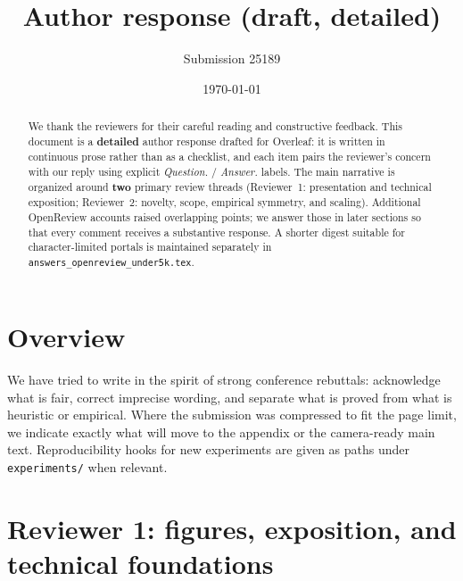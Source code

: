 \documentclass[11pt,a4paper]{article}
\title{Author response (draft, detailed)}
\author{Submission 25189}
\date{\today}
\begin{document}
\maketitle

\begin{abstract}
\noindent
We thank the reviewers for their careful reading and constructive feedback. This document is a \textbf{detailed} author response drafted for Overleaf: it is written in continuous prose rather than as a checklist, and each item pairs the reviewer's concern with our reply using explicit \textit{Question.} / \textit{Answer.} labels. The main narrative is organized around \textbf{two} primary review threads (Reviewer~1: presentation and technical exposition; Reviewer~2: novelty, scope, empirical symmetry, and scaling). Additional OpenReview accounts raised overlapping points; we answer those in later sections so that every comment receives a substantive response. A shorter digest suitable for character-limited portals is maintained separately in \texttt{answers\_openreview\_under5k.tex}.
\end{abstract}

\section*{Overview}

\noindent
We have tried to write in the spirit of strong conference rebuttals: acknowledge what is fair, correct imprecise wording, and separate what is proved from what is heuristic or empirical. Where the submission was compressed to fit the page limit, we indicate exactly what will move to the appendix or the camera-ready main text. Reproducibility hooks for new experiments are given as paths under \texttt{experiments/} when relevant.

\section*{Reviewer 1: figures, exposition, and technical foundations}
\end{document}
